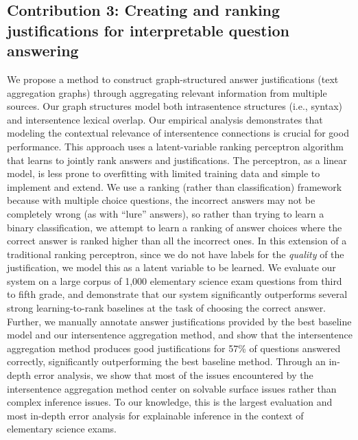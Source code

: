 \subsection{Contribution 3: Creating and ranking justifications for interpretable question answering} 
\label{sec:cl2017contribution} 
We propose a method to construct graph-structured answer justifications (text aggregation graphs) through aggregating relevant information from multiple sources.  Our graph structures model both intrasentence structures (i.e., syntax) and intersentence lexical overlap.
Our empirical analysis demonstrates that modeling the contextual relevance of intersentence connections is crucial for good performance.  %
This approach uses a latent-variable ranking perceptron algorithm that learns to jointly rank answers and justifications.  The perceptron, as a linear model, is less prone to overfitting with limited training data and simple to implement and extend.  We use a ranking (rather than classification) framework because with multiple choice questions, the incorrect answers may not be completely wrong (as with ``lure'' answers), so rather than trying to learn a binary classification, we attempt to learn a ranking of answer choices where the correct answer is ranked higher than all the incorrect ones.  In this extension of a traditional ranking perceptron, since we do not have labels for the  \emph{quality} of the justification, we model this as a latent variable to be learned. 
We evaluate our system on a large corpus of 1,000 elementary science exam questions from third to fifth grade, and demonstrate that our system significantly outperforms several strong learning-to-rank baselines at the task of choosing the correct answer.  Further, we manually annotate answer justifications provided by the best baseline model and our intersentence aggregation method, and show that the intersentence aggregation method produces good justifications for 57\% of questions answered correctly, significantly outperforming the best baseline method. 
Through an in-depth error analysis, we show that most of the issues encountered by the intersentence aggregation method center on solvable surface issues rather than complex inference issues.  To our knowledge, this is the largest evaluation and most in-depth error analysis for explainable inference in the context of elementary science exams. 


